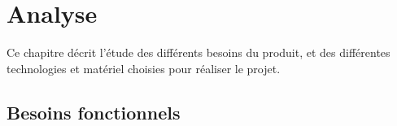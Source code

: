 
\chapter{Analyse}

Ce chapitre décrit l'étude des différents besoins du produit, et des différentes technologies et matériel choisies pour réaliser le projet.

\section{Besoins fonctionnels}
